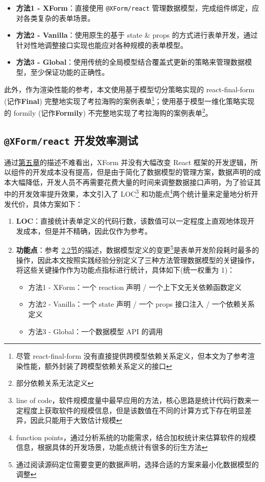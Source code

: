 \documentclass[winfonts,master,twoside]{njuthesis}
\makeatletter
\newcommand{\xform}[1]{\texttt{@XForm/#1}}
\makeatother
\begin{document}
\begin{itemize}
    \item \textbf{方法1 - XForm}：直接使用 \xform{react} 管理数据模型，完成组件绑定，应对各类复杂的表单场景。
    \item \textbf{方法2 - Vanilla}：使用原生的基于 state \& props 的方式进行表单开发，通过针对性地调整接口实现也能应对各种规模的表单模型。
    \item \textbf{方法3 - Global}：使用传统的全局模型结合覆盖式更新的策略来管理数据模型，至少保证功能的正确性。
\end{itemize}

此外，作为渲染性能的参考，本文使用基于模型切分策略实现的 react-final-form (记作\textbf{Final}) 完整地实现了考拉海购的案例表单\footnote{尽管 react-final-form 没有直接提供跨模型依赖关系定义，但本文为了参考渲染性能，额外封装了跨模型依赖关系定义的接口}；使用基于模型一维化策略实现的 formily (记作\textbf{Formily}) 不完整地实现了考拉海购的案例表单\footnote{部分依赖关系无法定义}。

\subsection{\xform{react} 开发效率测试}

通过\hyperref[datamodel-driven-form-development-toolkit]{第五章}的描述不难看出，XForm 并没有大幅改变 React 框架的开发逻辑，所以组件的开发成本没有提高，但是由于简化了数据模型的管理方案，数据声明的成本大幅降低，开发人员不再需要花费大量的时间来调整数据接口声明，为了验证其中的开发效率提升效果，本文引入了 LOC\footnote{line of code，软件规模度量中最早应用的方法，核心思路是统计代码行数来一定程度上获取软件的规模信息\cite{tran2002measuring}，但是该数值在不同的计算方式下存在明显差异，因此只能用于大致估计规模\cite{jones1985programming}} 和功能点\footnote{function
 points，通过分析系统的功能需求，结合加权统计来估算软件的规模信息\cite{matson1994software}，根据具体的开发场景，功能点统计有很多的衍生方法}两个统计量来定量地分析开发代价，具体方案如下：

\begin{enumerate}
    \item \textbf{LOC}：直接统计表单定义的代码行数，该数值可以一定程度上直观地体现开发成本，但是并不精确，因此仅作为参考。
    \item \textbf{功能点}：参考 \hyperref[form-development-scene]{2.2节}的描述，数据模型定义的变更\footnote{通过阅读源码定位需要变更的数据声明，选择合适的方案来最小化数据模型的调整}是表单开发阶段耗时最多的操作，因此本文按照实践经验分别定义了三种方法管理数据模型的关键操作，将这些关键操作作为功能点指标进行统计，具体如下(统一权重为 1)：
          \begin{itemize}
              \item 方法1 - XForm：一个 reaction 声明 / 一个上下文无关依赖函数定义
              \item 方法2 - Vanilla：一个 state 声明 / 一个 props 接口注入 / 一个依赖关系定义
              \item 方法3 - Global：一个数据模型 API 的调用
          \end{itemize}
\end{enumerate}
\end{document}
